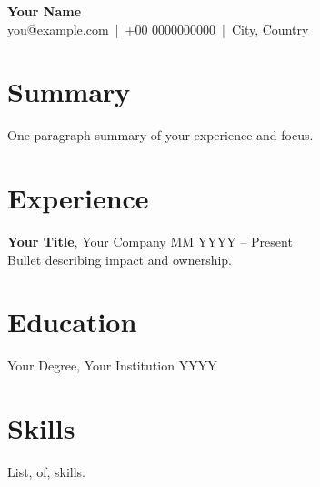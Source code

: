 \documentclass[11pt,a4paper]{article}
\begin{document}
\begin{center}
{\Large \textbf{Your Name}}\\
you@example.com \,|\, +00 0000000000 \,|\, City, Country
\end{center}

\section*{Summary}
One-paragraph summary of your experience and focus.

\section*{Experience}
\textbf{Your Title}, Your Company \hfill MM YYYY -- Present\\
Bullet describing impact and ownership.

\section*{Education}
Your Degree, Your Institution \hfill YYYY

\section*{Skills}
List, of, skills.
\end{document}
